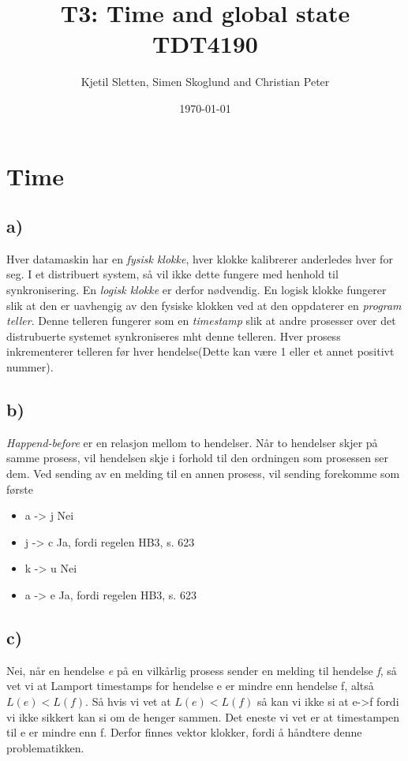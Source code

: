 \documentclass{article}
\begin{document}
\title{T3: Time and global state\\TDT4190}
\author{Kjetil Sletten, Simen Skoglund and Christian Peter}
\date{\today}
\maketitle
\section{Time}
\subsection*{a)}
Hver datamaskin har en \emph{fysisk klokke}, hver klokke kalibrerer anderledes hver for seg. I et distribuert system, så vil ikke dette fungere med henhold til synkronisering. En \emph{logisk klokke} er derfor nødvendig. En logisk klokke fungerer slik at den er uavhengig av den fysiske klokken ved at den oppdaterer en \emph{program teller}. Denne telleren fungerer som en \emph{timestamp} slik at andre prosesser over det distrubuerte systemet synkroniseres mht denne telleren. Hver prosess inkrementerer telleren før hver hendelse(Dette kan være 1 eller et annet positivt nummer).


\subsection*{b)}
\emph{Happend-before} er en relasjon mellom to hendelser. Når to hendelser skjer på samme prosess, vil hendelsen skje i forhold til den ordningen som prosessen ser dem. Ved sending av en melding til en annen prosess, vil sending forekomme som første 
\begin{itemize}
	\item a -> j Nei
	\item j -> c Ja, fordi regelen HB3, s. 623
	\item k -> u Nei
	\item a -> e Ja, fordi regelen HB3, s. 623
\end{itemize}
\subsection*{c)}
Nei, når en hendelse \emph{e} på en vilkårlig prosess sender en melding til hendelse \emph{f}, så vet vi at Lamport timestamps for hendelse e er mindre enn hendelse f, altså $L(e) < L(f)$. Så hvis vi vet at $L(e) < L(f)$ så kan vi ikke si at e->f fordi vi ikke sikkert kan si om de henger sammen. Det eneste vi vet er at timestampen til e er mindre enn f. Derfor finnes vektor klokker, fordi å håndtere denne problematikken. 
\end{document}
